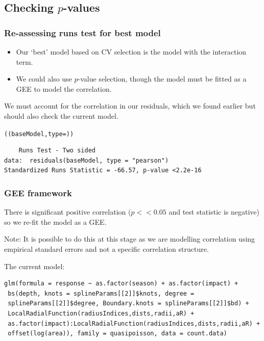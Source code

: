 
\subsection{Checking $p$-values}

\begin{frame}[fragile]
\frametitle{Re-assessing runs test for best model}
\begin{itemize}
\item Our `best' model based on CV selection is the model with the interaction term. 
\item We could also use $p$-value selection, though the model must be fitted as a GEE to model the correlation.
\end{itemize}

We must account for the correlation in our residuals, which we found earlier but should also check the current model.
\begin{knitrout}\footnotesize
{}\color{fgcolor}\begin{kframe}
\begin{alltt}
((baseModel, type = ))
\end{alltt}
\begin{verbatim}
	Runs Test - Two sided
data:  residuals(baseModel, type = "pearson") 
Standardized Runs Statistic = -66.57, p-value <2.2e-16
\end{verbatim}
\end{kframe}
\end{knitrout}


\end{frame}

\begin{frame}[fragile]
\frametitle{GEE framework}
There is significant positive correlation ($p<<0.05$ and test statistic is negative) so we re-fit the model as a GEE.

\bigskip
Note: It is possible to do this at this stage as we are modelling correlation using empirical standard errors and not a specific correlation structure.

\bigskip
\noindent The current model:
\footnotesize
\begin{verbatim}
glm(formula = response ~ as.factor(season) + as.factor(impact) + 
 bs(depth, knots = splineParams[[2]]$knots, degree = 
 splineParams[[2]]$degree, Boundary.knots = splineParams[[2]]$bd) + 
 LocalRadialFunction(radiusIndices,dists,radii,aR) + 
 as.factor(impact):LocalRadialFunction(radiusIndices,dists,radii,aR) +
 offset(log(area)), family = quasipoisson, data = count.data)
\end{verbatim}
\normalsize
\end{frame}

